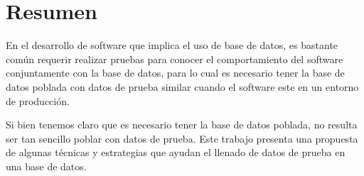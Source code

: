 
\chapter*{Resumen}
En el desarrollo de software que implica el uso de base de datos, es bastante com\'un requerir realizar pruebas para conocer el comportamiento del software conjuntamente con la base de datos, para lo cual es necesario tener la base de datos poblada con datos de prueba similar cuando el software este en un entorno de producci\'on. 

Si bien tenemos claro que es necesario tener la base de datos poblada, no resulta ser tan sencillo poblar con datos de prueba. Este trabajo presenta una propuesta de algunas t\'ecnicas y estrategias que ayudan el llenado de datos de prueba en una base de datos.
